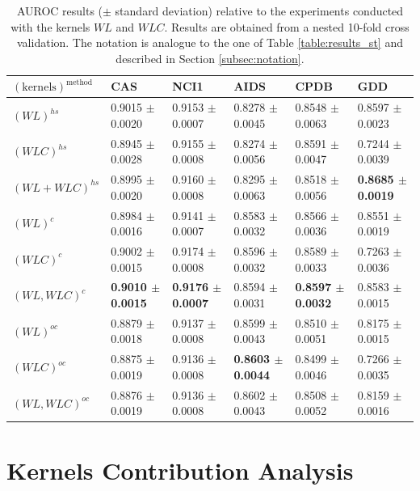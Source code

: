 \begin{landscape}
    \begin{table}[ht]
        \begin{tabular}{|l|l|l|l|l|l|}
            \hline
            $\mathrm{(kernels)^{method}}$&CAS&NCI1&AIDS&CPDB&GDD\\
            \hline
            $(WL)^{hs}$&0.9015 $\pm$ 0.0020&0.9153 $\pm$ 0.0007&0.8278 $\pm$ 0.0045&0.8548 $\pm$ 0.0063&0.8597 $\pm$ 0.0023\\
            $(WLC)^{hs}$&0.8945 $\pm$ 0.0028&0.9155 $\pm$ 0.0008&0.8274 $\pm$ 0.0056&0.8591 $\pm$ 0.0047&0.7244 $\pm$  0.0039\\
            $(WL + WLC)^{hs}$&0.8995 $\pm$ 0.0020&0.9160 $\pm$ 0.0008&0.8295 $\pm$ 0.0063&0.8518 $\pm$ 0.0056&\textbf{0.8685 $\pm$ 0.0019}\\
            \hline
            $(WL)^c$&0.8984 $\pm$ 0.0016&0.9141 $\pm$ 0.0007&0.8583 $\pm$ 0.0032&0.8566 $\pm$  0.0036&0.8551 $\pm$ 0.0019\\
            $(WLC)^c$&0.9002 $\pm$ 0.0015&0.9174 $\pm$ 0.0008&0.8596 $\pm$ 0.0032&0.8589 $\pm$ 0.0033&0.7263 $\pm$ 0.0036\\
            $(WL, WLC)^c$&\textbf{0.9010 $\pm$ 0.0015}&\textbf{0.9176 $\pm$ 0.0007}&0.8594 $\pm$ 0.0031 &\textbf{0.8597 $\pm$ 0.0032}&0.8583 $\pm$ 0.0015\\
            \hline
            $(WL)^{oc}$&0.8879 $\pm$ 0.0018&0.9137 $\pm$ 0.0008&0.8599 $\pm$ 0.0043&0.8510 $\pm$ 0.0051&0.8175 $\pm$ 0.0015\\
            $(WLC)^{oc}$&0.8875 $\pm$ 0.0019&0.9136 $\pm$ 0.0008&\textbf{0.8603 $\pm$ 0.0044}&0.8499 $\pm$ 0.0046&0.7266 $\pm$ 0.0035\\
            $(WL, WLC)^{oc}$&0.8876 $\pm$ 0.0019&0.9136 $\pm$ 0.0008&0.8602 $\pm$ 0.0043&0.8508 $\pm$ 0.0052&0.8159 $\pm$ 0.0016\\
            \hline
        \end{tabular}
        \caption{AUROC results ($\pm$ standard deviation) relative to the experiments
                conducted with the kernels $WL$ and $WLC$. Results are
                obtained from a nested 10-fold cross validation.
                The notation is analogue to the one of Table \ref{table:results_st} and described in Section \ref{subsec:notation}.}
        \label{table:results_wl}
    \end{table}

\end{landscape}

\section{Kernels Contribution Analysis}
\label{sec:kca}

